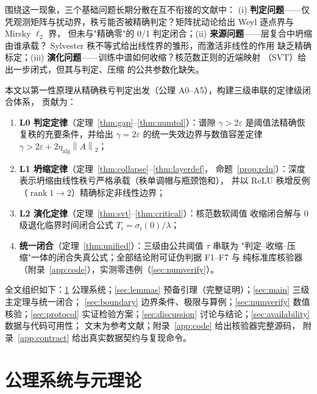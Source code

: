 \documentclass[UTF8,11pt,a4paper]{ctexart}
\theoremstyle{plain}
\theoremstyle{definition}
\theoremstyle{remark}
\newcommand{\rank}{\operatorname{rank}}
\newcommand{\Tnorm}[1]{\left\lVert #1\right\rVert_2}
\begin{document}
围绕这一现象，三个基础问题长期分散在互不衔接的文献中：
(i) \textbf{判定问题}——仅凭观测矩阵与扰动界，秩亏能否被精确判定？矩阵扰动论给出
Weyl 逐点界与 Mirsky $\ell_2$ 界\cite{weyl1912,mirsky1960,stewart1990,wedin1972}，
但未与"精确零"的 0/1 判定闭合；(ii) \textbf{来源问题}——层复合中坍缩由谁承载？
Sylvester 秩不等式\cite{sylvester1884,horn1991}给出线性界的雏形，而激活非线性的作用
缺乏精确标定；(iii) \textbf{演化问题}——训练中谱如何收缩？核范数正则的近端映射
（SVT）\cite{fazel2002,candes2009,recht2010,cai2010}给出一步闭式，但其与判定、压缩
的公共参数化缺失。

本文以第一性原理从精确秩亏判定出发（公理 A0--A5），构建三级串联的定律级闭合体系，
贡献为：
\begin{enumerate}
\item \textbf{L0 判定定律}（定理~\ref{thm:gap}--\ref{thm:numtol}）：谱隙
  $\gamma>2\varepsilon$ 是阈值法精确恢复秩的充要条件，并给出
  $\gamma=2\varepsilon$ 的统一失效边界与数值容差定律
  $\gamma>2\varepsilon+2\eta_{\mathrm{alg}}\Tnorm{A}$；
\item \textbf{L1 坍缩定律}（定理~\ref{thm:collapse}--\ref{thm:layerdef}，
  命题~\ref{prop:relu}）：深度表示坍缩由线性秩亏严格承载（秩单调帽与瓶颈饱和），
  并以 ReLU 秩增反例（$\rank 1\to2$）精确标定非线性边界；
\item \textbf{L2 演化定律}（定理~\ref{thm:svt}--\ref{thm:critical}）：核范数软阈值
  收缩闭合解与 0 级退化临界时间闭合公式 $T_i=\sigma_i(0)/\lambda$；
\item \textbf{统一闭合}（定理~\ref{thm:unified}）：三级由公共阈值 $\tau$ 串联为
  "判定--收缩--压缩"一体的闭合失真公式；全部结论附可证伪判据 F1--F7 与
  纯标准库核验器（附录~\ref{app:code}），实测零违例（\textsection\ref{sec:numverify}）。
\end{enumerate}

全文组织如下：\textsection\ref{sec:axioms} 公理系统；\textsection\ref{sec:lemmas}
预备引理（完整证明）；\textsection\ref{sec:main} 三级主定理与统一闭合；
\textsection\ref{sec:boundary} 边界条件、极限与算例；\textsection\ref{sec:numverify}
数值核验；\textsection\ref{sec:protocol} 实证检验方案；\textsection\ref{sec:discussion}
讨论与结论；\textsection\ref{sec:availability} 数据与代码可用性；
文末为参考文献；附录~\ref{app:code} 给出核验器完整源码，
附录~\ref{app:contract} 给出真实数据契约与复现命令。

\section{公理系统与元理论}\label{sec:axioms}
\end{document}
